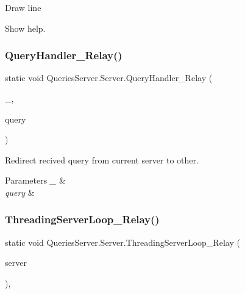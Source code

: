 Draw line

Show help. \mbox{\label{class_queries_server_1_1_server_ac288a3c122f127e67894b255edd823af}} 
\subsubsection{\texorpdfstring{Query\+Handler\+\_\+\+Relay()}{QueryHandler\_Relay()}}
{\footnotesize\ttfamily static void Queries\+Server.\+Server.\+Query\+Handler\+\_\+\+Relay (\begin{DoxyParamCaption}\item[{\mbox{\hyperlink{class_pipes_provider_1_1_server_1_1_server_transmission_controller}{Server\+Transmission\+Controller}}}]{\+\_\+,  }\item[{string}]{query }\end{DoxyParamCaption})\hspace{0.3cm}{\ttfamily [static]}}



Redirect recived query from current server to other. 


\begin{DoxyParams}{Parameters}
{\em \+\_\+} & \\
\hline
{\em query} & \\
\hline
\end{DoxyParams}
\mbox{\label{class_queries_server_1_1_server_af78ec354d7f465d29800f812996dc91b}} 
\subsubsection{\texorpdfstring{Threading\+Server\+Loop\+\_\+\+Relay()}{ThreadingServerLoop\_Relay()}}
{\footnotesize\ttfamily static void Queries\+Server.\+Server.\+Threading\+Server\+Loop\+\_\+\+Relay (\begin{DoxyParamCaption}\item[{object}]{server }\end{DoxyParamCaption})\hspace{0.3cm}{\ttfamily [static]}, {\ttfamily [protected]}}



